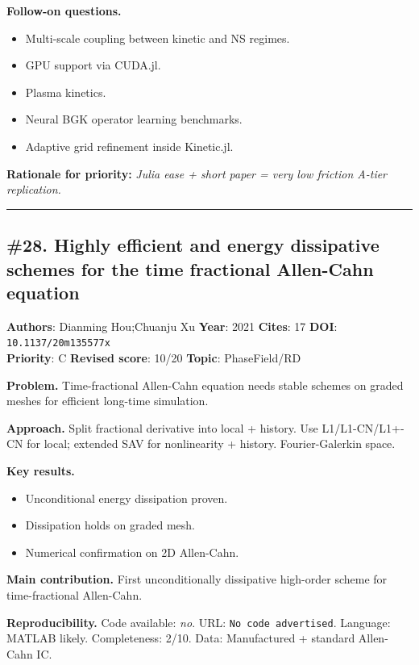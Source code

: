 \documentclass[10pt,letterpaper]{article}
\begin{document}
\textbf{Follow-on questions.}
\begin{itemize}
\item Multi-scale coupling between kinetic and NS regimes.
\item GPU support via CUDA.jl.
\item Plasma kinetics.
\item Neural BGK operator learning benchmarks.
\item Adaptive grid refinement inside Kinetic.jl.
\end{itemize}

\textbf{Rationale for priority:} \emph{Julia ease + short paper = very low friction A-tier replication.}

\medskip\hrule\medskip

\subsection*{\#28. Highly efficient and energy dissipative schemes for the time fractional Allen-Cahn equation}
\textbf{Authors}: Dianming Hou;Chuanju Xu \textbullet{} \textbf{Year}: 2021 \textbullet{} \textbf{Cites}: 17 \textbullet{} \textbf{DOI}: \texttt{10.1137/20m135577x} \\
\textbf{Priority}: C \textbullet{} \textbf{Revised score}: 10/20 \textbullet{} \textbf{Topic}: PhaseField/RD

\textbf{Problem.} Time-fractional Allen-Cahn equation needs stable schemes on graded meshes for efficient long-time simulation.

\textbf{Approach.} Split fractional derivative into local + history. Use L1/L1-CN/L1+-CN for local; extended SAV for nonlinearity + history. Fourier-Galerkin space.

\textbf{Key results.}
\begin{itemize}
\item Unconditional energy dissipation proven.
\item Dissipation holds on graded mesh.
\item Numerical confirmation on 2D Allen-Cahn.
\end{itemize}

\textbf{Main contribution.} First unconditionally dissipative high-order scheme for time-fractional Allen-Cahn.

\textbf{Reproducibility.} Code available: \emph{no}. URL: \texttt{No code advertised}. Language: MATLAB likely. Completeness: 2/10. Data: Manufactured + standard Allen-Cahn IC.
\end{document}
